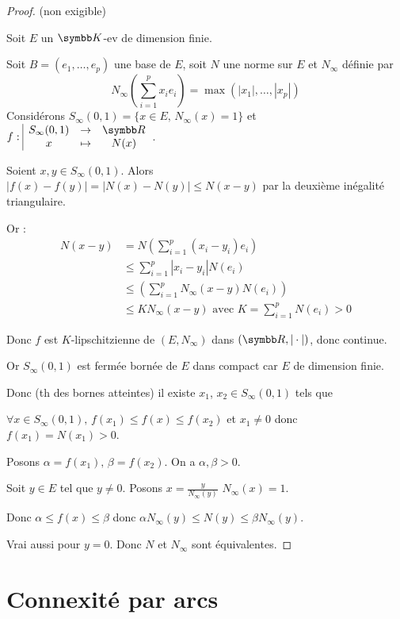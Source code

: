 \begin{proof}(non exigible)

    Soit $E$ un $\K$-ev de dimension finie. 

    Soit $B = (e_1, \ldots, e_p)$ une base de $E$, soit $N$ une norme sur $E$ et $N_\infty$ définie par 
    \[N_\infty \left( \sum_{i=1}^p x_i e_i \right) = \max(|x_1|, \ldots, |x_p|)\]
    Considérons $S_\infty (0, 1) = \{ x \in E, \, N_\infty(x) = 1 \}$ et 
    $\fonction f {S_\infty(0, 1)}{\R}{x}{N(x)}$.

    Soient $x, y \in S_\infty(0, 1)$. Alors $| f(x) - f(y)| = |N(x) - N(y)| \leqslant N(x - y)$ par la deuxième inégalité triangulaire. 

    Or : \begin{align*}
        N(x - y) & = N\left( \sum_{i=1}^p (x_i - y_i) e_i \right) \\
        & \leqslant \sum_{i=1}^p |x_i - y_i| N(e_i) \\
        & \leqslant \left( \sum_{i=1}^p N_\infty(x - y) N(e_i) \right) \\
        & \leqslant K N_\infty(x - y) \text{ avec } K = \sum_{i=1}^p N(e_i) > 0
    \end{align*}

    Donc $f$ est $K$-lipschitzienne de $(E, N_\infty)$ dans $(\R, |\cdot |)$, donc continue.

    Or $S_\infty(0, 1)$ est fermée bornée de $E$ dans compact car $E$ de dimension finie. 

    Donc (th des bornes atteintes) il existe $x_1$, $x_2 \in S_\infty(0, 1)$ tels que

    $\forall x \in S_\infty(0, 1), \, f(x_1) \leqslant f(x) \leqslant f(x_2)$ et 
    $x_1 \neq 0$ donc $f(x_1) = N(x_1) > 0$. 

    Posons $ \alpha = f(x_1), \, \beta = f(x_2)$. On a $\alpha, \beta > 0$. 

    Soit $y \in E$ tel que $y \neq 0$. Posons $x = \frac y {N_\infty(y)}$ $N_\infty(x) = 1$.

    Donc $\alpha \leqslant f(x) \leqslant \beta$ donc $\alpha N_\infty(y) \leqslant N(y) \leqslant \beta N_\infty(y)$.

    Vrai aussi pour $y = 0$. Donc $N$ et $N_\infty$ sont équivalentes.
\end{proof}

\section{Connexité par arcs}

